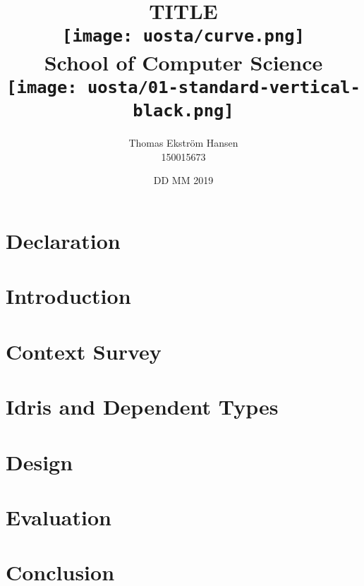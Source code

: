 \documentclass[12pt]{report}
\title{
    {TITLE}\\
    \vspace{2cm}
    {\texttt{[image: uosta/curve.png]}}\\
    {\fontfamily{ppl}\selectfont\large School of Computer Science}\\
    \vspace{-0.8cm}
    {\texttt{[image: uosta/01-standard-vertical-black.png]}}\\
    \vspace{-2cm}
}
\author{
    {Thomas Ekstr{\" o}m Hansen}\\
    {150015673}
}
\date{DD MM 2019}
\begin{document}
    \maketitle
    
    \chapter*{Declaration}
    
    
    \tableofcontents
    
    \chapter{Introduction}
    
    
    \chapter{Context Survey}
    
    
    \chapter{Idris and Dependent Types}
    
        
    \chapter{Design}
    
    
    \chapter{Evaluation}
    
        
    \chapter{Conclusion}
    
    
    
    
\end{document}
